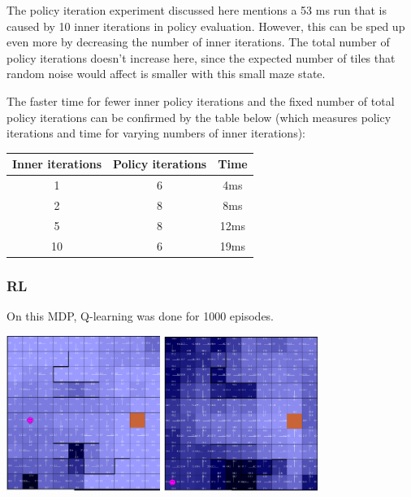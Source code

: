\documentclass[11pt]{article}
\begin{document}
            The policy iteration experiment discussed here mentions a 53 ms run that is caused by
            10 inner iterations in policy evaluation. However, this can be sped up even more by
            decreasing the number of inner iterations. The total number of policy iterations doesn't
            increase here, since the expected number of tiles that random noise would affect is
            smaller with this small maze state.

            The faster time for fewer inner policy iterations and the fixed number of total policy
            iterations can be confirmed by the table below (which measures policy iterations
            and time for varying numbers of inner iterations):

            \begin{tabular}{c c c}
                Inner iterations & Policy iterations & Time \\ \hline
                1 & 6 & 4ms \\ \hline
                2 & 8 & 8ms \\ \hline
                5 & 8 & 12ms \\ \hline
                10 & 6 & 19ms \\ \hline

            \end{tabular}


            \subsubsection{RL}

            On this MDP, Q-learning was done for 1000 episodes.

            \includegraphics[width=5cm]{../images/small/q_middle.PNG}
            \includegraphics[width=5cm]{../images/small/q_1000.PNG}
\end{document}

